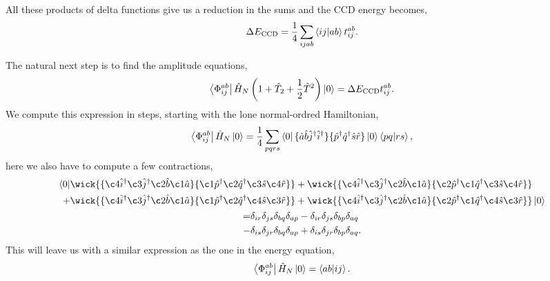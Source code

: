 All these products of delta functions give us a reduction in the sums and the CCD
energy becomes,
\begin{equation}
    \Delta E_{\text{CCD}} = \frac{1}{4}\sum_{ijab}\bra{ij} \ket{ab} t^{ab}_{ij}.
\end{equation}

The natural next step is to find the amplitude equations,
\begin{equation}
    \bra{\Phi^{ab}_{ij}}\hat{H}_N\left(1 + \hat{T}_2 + \frac{1}{2}\hat{T}^2\right) \ket{0}
        = \Delta E_{\text{CCD}} t^{ab}_{ij}.
\end{equation}
We compute this expression in steps, starting with the lone normal-ordred Hamiltonian,
\begin{equation}
    \bra{\Phi^{ab}_{ij}} \hat{H}_N \ket{0}
        = \frac{1}{4}\sum_{pqrs} \bra{0}
        \{\hat{a}\hat{b}\hat{j}^\dagger\hat{i}^\dagger\}
        \{\hat{p}^\dagger\hat{q}^\dagger\hat{s}\hat{r}\}
        \ket{0}\bra{pq} \ket{rs},
\end{equation}
here we also have to compute a few contractions,
\begin{gather}
    \begin{aligned}
        \bra{0}
        &\wick{
        \{ \c4{\hat{i}}^\dagger \c3{\hat{j}}^\dagger \c2{\hat{b}} \c1{\hat{a}}\}
        \{ \c1{\hat{p}}^\dagger \c2{\hat{q}}^\dagger \c3{\hat{s}} \c4{\hat{r}} \}
        }
        +\wick{
        \{ \c4{\hat{i}}^\dagger \c3{\hat{j}}^\dagger \c2{\hat{b}} \c1{\hat{a}}\}
        \{ \c2{\hat{p}}^\dagger \c1{\hat{q}}^\dagger \c3{\hat{s}} \c4{\hat{r}} \}
        } \\
        +&\wick{
        \{ \c4{\hat{i}}^\dagger \c3{\hat{j}}^\dagger \c2{\hat{b}} \c1{\hat{a}}\}
        \{ \c1{\hat{p}}^\dagger \c2{\hat{q}}^\dagger \c4{\hat{s}} \c3{\hat{r}} \}
        }
        +\wick{
        \{ \c4{\hat{i}}^\dagger \c3{\hat{j}}^\dagger \c2{\hat{b}} \c1{\hat{a}}\}
        \{ \c2{\hat{p}}^\dagger \c1{\hat{q}}^\dagger \c4{\hat{s}} \c3{\hat{r}} \}
        }
        \ket{0}
    \end{aligned} \\
    \begin{aligned}
        =&\delta_{ir}\delta_{js}\delta_{bq}\delta_{ap} 
        -\delta_{ir}\delta_{js}\delta_{bp}\delta_{aq}\\
        -&\delta_{is}\delta_{jr}\delta_{bq}\delta_{ap}
        +\delta_{is}\delta_{jr}\delta_{bp}\delta_{aq}.
    \end{aligned} 
\end{gather}
This will leave us with a similar expression as the one in the energy equation,
\begin{equation}
    \bra{\Phi^{ab}_{ij}} \hat{H}_N \ket{0} = \bra{ab} \ket{ij}.
\end{equation}

